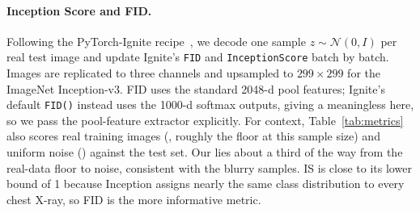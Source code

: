 \documentclass{article}
\begin{document}
\paragraph{Inception Score and FID.}
Following the PyTorch-Ignite recipe~\cite{ignite}, we decode one sample $z \sim \mathcal{N}(0, I)$
per real test image and update Ignite's \texttt{FID} and \texttt{InceptionScore} batch by batch.
Images are replicated to three channels and upsampled to $299{\times}299$ for the ImageNet
Inception-v3. FID uses the standard 2048-d pool features; Ignite's default \texttt{FID()} instead
uses the 1000-d softmax outputs, giving a meaningless \FIDSoftmax{} here, so we pass the
pool-feature extractor explicitly. For context, Table~\ref{tab:metrics} also scores \NumTest{} real
training images (\FIDRealRef, roughly the floor at this sample size) and uniform noise
(\FIDNoiseRef) against the test set. Our \FID{} lies about a third of the way from the real-data
floor to noise, consistent with the blurry samples. IS is close to its lower bound of 1 because
Inception assigns nearly the same class distribution to every chest X-ray, so FID is the more
informative metric.
\end{document}

